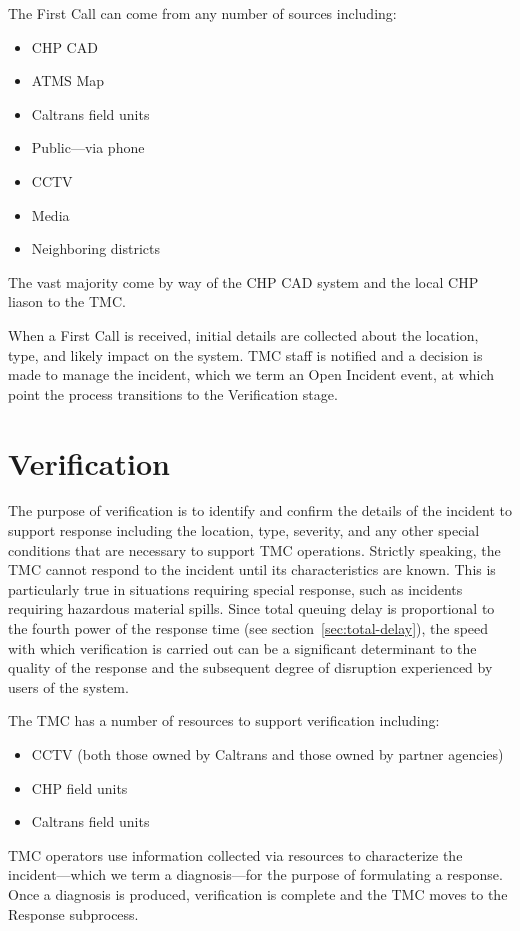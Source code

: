\documentclass[12pt]{report}
\begin{document}
The {\sc First Call} can come from any number of sources including:
\begin{itemize}
\item CHP CAD
\item ATMS Map
\item Caltrans field units
\item Public---via phone
\item CCTV
\item Media
\item Neighboring districts
\end{itemize}
The vast majority come by way of the CHP CAD system and the local CHP liason to
the TMC.

When a {\sc First Call} is received, initial details are collected about the
location, type, and likely impact on the system.  TMC staff is notified and a
decision is made to manage the incident, which we term an {\sc Open Incident}
event, at which point the process transitions to the Verification stage.


\section{Verification}
\label{sec:verification}

The purpose of verification is to identify and confirm the details of the
incident to support response including the location, type, severity, and any
other special conditions that are necessary to support TMC operations.  Strictly
speaking, the TMC cannot respond to the incident until its characteristics are
known.  This is particularly true in situations requiring special response, such
as incidents requiring hazardous material spills.  Since total queuing delay is
proportional to the fourth power of the response time (see
section~\ref{sec:total-delay}), the speed with which verification is carried out
can be a significant determinant to the quality of the response and the
subsequent degree of disruption experienced by users of the system.

The TMC has a number of resources to support verification including:
\begin{itemize}
\item CCTV (both those owned by Caltrans and those owned by partner
  agencies)
\item CHP field units
\item Caltrans field units
\end{itemize}
TMC operators use information collected via resources to characterize the
incident---which we term a diagnosis---for the purpose of formulating a
response.  Once a diagnosis is produced, verification is complete and the TMC
moves to the {\sc Response} subprocess.
\end{document}
